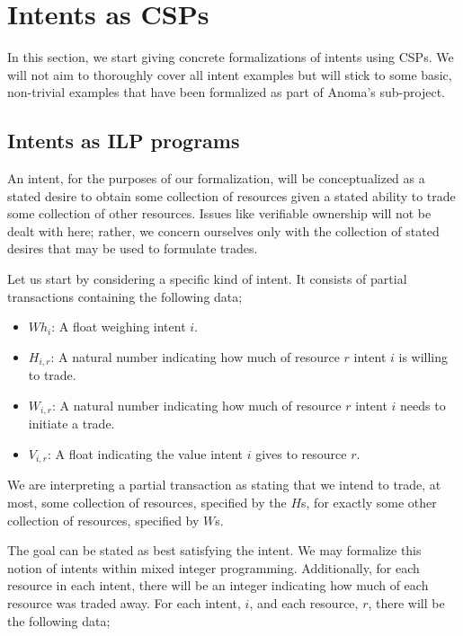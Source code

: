 \section{Intents as CSPs}\label{sec:csp-intents}

In this section, we start giving concrete formalizations of intents using CSPs.
We will not aim to thoroughly cover all intent examples but will stick to some
basic, non-trivial examples that have been formalized as part of Anoma's
 sub-project.

\subsection{Intents as ILP programs}\label{sec:ilp-intents}

An intent, for the purposes of our formalization, will be conceptualized as a stated desire to obtain some collection of resources given a stated ability to trade some collection of other resources. Issues like verifiable ownership will not be dealt with here; rather, we concern ourselves only with the collection of stated desires that may be used to formulate trades.

Let us start by considering a specific kind of intent. It consists of partial transactions containing the following data;

\begin{itemize}
    \item $Wh_i$: A float weighing intent $i$.
    \item $H_{i, r}$: A natural number indicating how much of resource $r$ intent $i$ is willing to trade.
    \item $W_{i, r}$: A natural number indicating how much of resource $r$ intent $i$ needs to initiate a trade.
    \item $V_{i, r}$: A float indicating the value intent $i$ gives to resource $r$.
\end{itemize}

We are interpreting a partial transaction as stating that we intend to trade, at most, some collection of resources, specified by the $H$s, for exactly some other collection of resources, specified by $W$s.

The goal can be stated as best satisfying the intent. We may formalize this notion of intents within mixed integer programming. Additionally, for each resource in each intent, there will be an integer indicating how much of each resource was traded away. For each intent, $i$, and each resource, $r$, there will be the following data;

